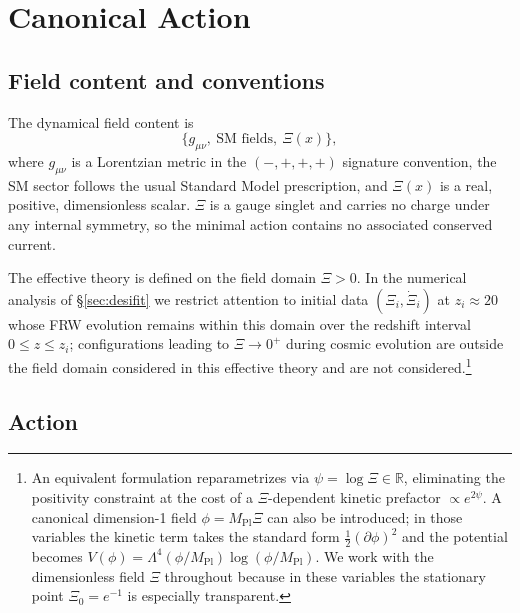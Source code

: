 \documentclass[11pt,reqno]{amsart}
\theoremstyle{plain}
\theoremstyle{definition}
\theoremstyle{remark}
\newcommand{\Pl}{\mathrm{Pl}}
\begin{document}
\section{Canonical Action}\label{sec:action}

\subsection{Field content and conventions}\label{sec:fieldcontent}

The dynamical field content is
\[
  \bigl\{ g_{\mu\nu},\ \text{SM fields},\ \Xi(x) \bigr\},
\]
where $g_{\mu\nu}$ is a Lorentzian metric in the $(-,+,+,+)$ signature
convention, the SM sector follows the usual Standard Model prescription,
and $\Xi(x)$ is a real, positive, dimensionless scalar. $\Xi$ is a gauge
singlet and carries no charge under any internal symmetry, so the
minimal action contains no associated conserved current.

The effective theory is defined on the field domain $\Xi > 0$. In the
numerical analysis of \S\ref{sec:desifit} we restrict attention to initial
data $(\Xi_i, \dot\Xi_i)$ at $z_i \approx 20$ whose FRW evolution remains
within this domain over the redshift interval $0 \leq z \leq z_i$;
configurations leading to $\Xi \to 0^{+}$ during cosmic evolution are
outside the field domain considered in this effective theory and are
not considered.\footnote{An
equivalent formulation reparametrizes via $\psi = \log\Xi \in \mathbb{R}$,
eliminating the positivity constraint at the cost of a $\Xi$-dependent
kinetic prefactor $\propto e^{2\psi}$. A canonical dimension-1 field
$\phi = M_\Pl \Xi$ can also be introduced; in those variables the kinetic
term takes the standard form $\tfrac{1}{2}(\partial\phi)^{2}$ and the
potential becomes $V(\phi) = \Lambda^{4}(\phi/M_\Pl) \log(\phi/M_\Pl)$.
We work with the dimensionless field $\Xi$ throughout because in these
variables the stationary point $\Xi_0 = e^{-1}$ is especially transparent.}

\subsection{Action}
\end{document}
